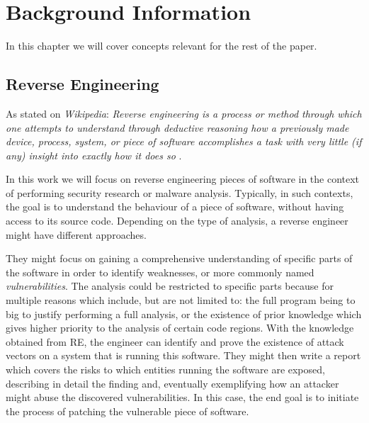 \chapter{Background Information} %

In this chapter we will cover concepts relevant for the rest of the paper. %

\section{Reverse Engineering} %

As stated on \emph{Wikipedia}: \emph{Reverse engineering is a process or method through which one attempts to understand through deductive reasoning how a previously made device, process, system, or piece of software accomplishes a task with very little (if any) insight into exactly how it does so} \cite{re_wiki}.


In this work we will focus on reverse engineering pieces of software in the context of performing security research or malware analysis. Typically, in such contexts, the goal is to understand the behaviour of a piece of software, without having access to its source code. Depending on the type of analysis, a reverse engineer might have different approaches. 

They might focus on gaining a comprehensive understanding of specific parts of the software in order to identify weaknesses, or more commonly named \emph{vulnerabilities}. The analysis could be restricted to specific parts because for multiple reasons which include, but are not limited to: the full program being to big to justify performing a full analysis, or the existence of prior knowledge which gives higher priority to the analysis of certain code regions. With the knowledge obtained from RE, the engineer can identify and prove the existence of attack vectors on a system that is running this software. They might then write a report which covers the risks to which entities running the software are exposed, describing in detail the finding and, eventually exemplifying how an attacker might abuse the discovered vulnerabilities. In this case, the end goal is to initiate the process of patching the vulnerable piece of software. %

